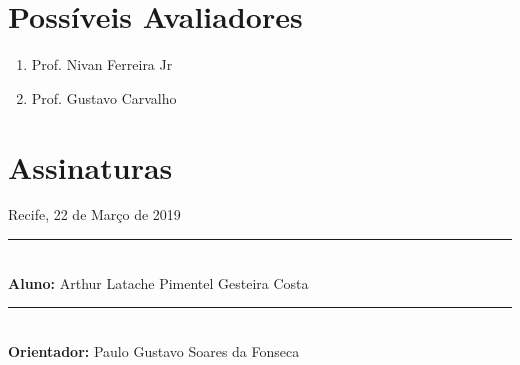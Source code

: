 \documentclass[12pt, a4paper, oneside]{article}
\begin{document}
\clearpage



\clearpage
\section{Possíveis Avaliadores}

\begin{enumerate}
\item Prof. Nivan Ferreira Jr 
\item Prof. Gustavo Carvalho 
\end{enumerate}


\clearpage
\section{Assinaturas}

\vfill
\begin{center}
	Recife, 22 de Março de 2019

	\vspace{3cm}
	\rule{10cm}{.5pt}\\
	\textbf{Aluno:} Arthur Latache Pimentel Gesteira Costa\\

	\vspace{3cm}
	\rule{10cm}{.5pt}\\
	\textbf{Orientador:} Paulo Gustavo Soares da Fonseca\\
\end{center}
\vfill
\end{document}
